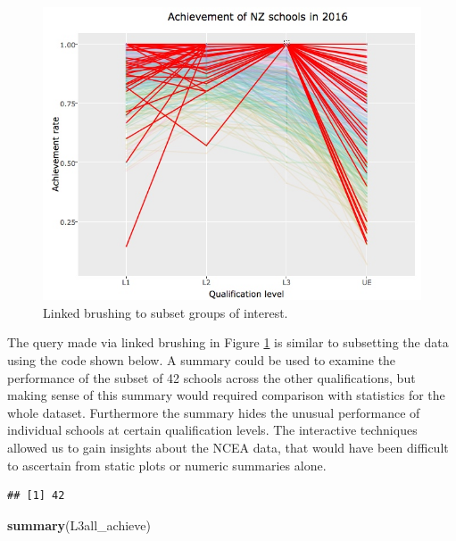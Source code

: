 \documentclass[]{book}
\newenvironment{Shaded}{\begin{snugshade}}{\end{snugshade}}
\newcommand{\KeywordTok}[1]{\textcolor[rgb]{0.13,0.29,0.53}{\textbf{{#1}}}}
\newcommand{\DecValTok}[1]{\textcolor[rgb]{0.00,0.00,0.81}{{#1}}}
\newcommand{\StringTok}[1]{\textcolor[rgb]{0.31,0.60,0.02}{{#1}}}
\newcommand{\NormalTok}[1]{{#1}}
\theoremstyle{definition}
\theoremstyle{definition}
\theoremstyle{definition}
\theoremstyle{remark}
\begin{document}
\begin{figure}[center]
\includegraphics[width=700px]{files/pcp_L3} \caption{Linked brushing to subset groups of interest.}\label{fig:pcpL3}
\end{figure}

The query made via linked brushing in Figure \ref{fig:pcpL3} is similar
to subsetting the data using the code shown below. A summary could be
used to examine the performance of the subset of 42 schools across the
other qualifications, but making sense of this summary would required
comparison with statistics for the whole dataset. Furthermore the
summary hides the unusual performance of individual schools at certain
qualification levels. The interactive techniques allowed us to gain
insights about the NCEA data, that would have been difficult to
ascertain from static plots or numeric summaries alone.

\begin{Shaded}
\end{Shaded}

\begin{verbatim}
## [1] 42
\end{verbatim}

\begin{Shaded}
\begin{Highlighting}[]
\KeywordTok{summary}\NormalTok{(L3all_achieve)}
\end{Highlighting}
\end{Shaded}
\end{document}
